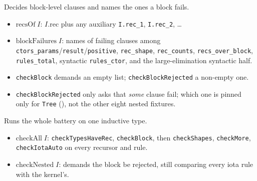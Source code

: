 \begin{example}
  \label{def:iotashape-blockfailures}
  \leanok

   Decides block-level clauses and names the ones a block fails.
  \begin{itemize}
  \item $\mathrm{recsOf}\;I$: $I.\mathrm{rec}$ plus any auxiliary \texttt{I.rec\_1},
        \texttt{I.rec\_2}, \dots
  \item $\mathrm{blockFailures}\;I$: names of failing clauses among
        \texttt{ctors\_params}/\texttt{result}/\texttt{positive}, \texttt{rec\_shape},
        \texttt{rec\_counts}, \texttt{recs\_over\_block}, \texttt{rules\_total}, syntactic
        \texttt{rules\_ctor}, and the large-elimination syntactic half.
  \item \texttt{checkBlock} demands an empty list; \texttt{checkBlockRejected} a non-empty one.
  \item {} \texttt{checkBlockRejected} only asks that \emph{some} clause fail; which one
        is pinned only for \texttt{Tree} (), not the
        other eight nested fixtures.
  \end{itemize}
\end{example}

\begin{example}
  \label{def:iotashape-checkall}
  \leanok

   Runs the whole battery on one inductive type.
  \begin{itemize}
  \item $\mathrm{checkAll}\;I$: \texttt{checkTypesHaveRec}, \texttt{checkBlock}, then
        \texttt{checkShapes}, \texttt{checkMore}, \texttt{checkIotaAuto} on every recursor and
        rule.
  \item $\mathrm{checkNested}\;I$: demands the block be rejected, still comparing every iota rule
        with the kernel's.
  \end{itemize}
\end{example}

